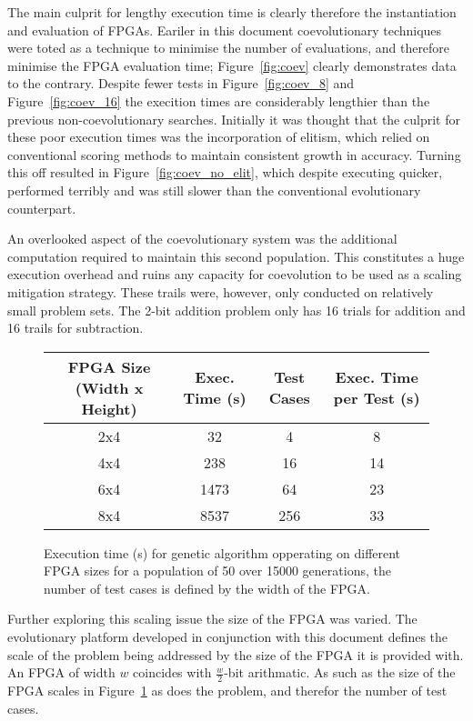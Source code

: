 The main culprit for lengthy execution time is clearly therefore the
instantiation and evaluation of FPGAs. Eariler in this document coevolutionary
techniques were toted as a technique to minimise the number of evaluations,
and therefore minimise the FPGA evaluation time; Figure~\ref{fig:coev}
clearly demonstrates data to the contrary. Despite fewer tests in
Figure~\ref{fig:coev_8} and Figure~\ref{fig:coev_16} the execition times
are considerably lengthier than the previous non-coevolutionary searches.
Initially it was thought that the culprit for these poor execution times
was the incorporation of elitism, which relied on conventional scoring
methods to maintain consistent growth in accuracy. Turning this off
resulted in Figure~\ref{fig:coev_no_elit}, which despite executing quicker,
performed terribly and was still slower than the conventional evolutionary
counterpart.

An overlooked aspect of the coevolutionary system was the additional computation
required to maintain this second population. This constitutes a huge execution
overhead and ruins any capacity for coevolution to be used as a scaling mitigation
strategy. These trails were, however, only conducted on relatively small problem
sets. The 2-bit addition problem only has 16 trials for addition and 16 trails
for subtraction.

\begin{figure}
	\centering
\begin{tabular}{cccc}
	\toprule
	\bfseries{FPGA Size (Width x Height)} & \bfseries{Exec. Time (s)} & \bfseries{Test Cases}
										  & \bfseries{Exec. Time per Test (s)} \\
	\midrule
	2x4 & 32 & 4 & 8\\
	4x4 & 238 & 16 & 14\\
	6x4 & 1473 & 64 & 23\\
	8x4 & 8537 & 256 & 33\\
	\bottomrule
\end{tabular}
\caption[Execution time for genetic algorithm opperating on different FPGA sizes]
{Execution time (s) for genetic algorithm opperating on different FPGA sizes for
a population of 50 over 15000 generations, the number of test cases is defined
by the width of the FPGA.}
\label{fig:size}
\end{figure}

Further exploring this scaling issue the size of the FPGA was varied.
The evolutionary platform developed in conjunction with this document
defines the scale of the problem being addressed by the size of the FPGA
it is provided with. An FPGA of width $w$ coincides with $\frac{w}{2}$-bit arithmatic.
As such as the size of the FPGA scales in Figure~\ref{fig:size} as does
the problem, and therefor the number of test cases.

